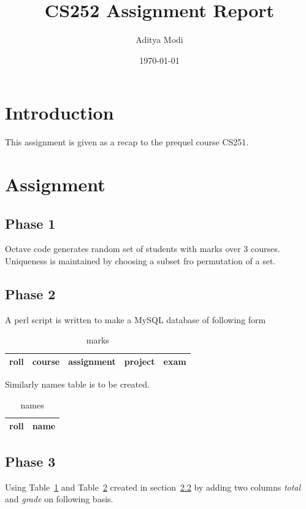 \documentclass{article}
\author{Aditya Modi}
\title{CS252 Assignment Report}
\date{\today}
\begin{document}
\maketitle

\section{Introduction}
This assignment is given as a recap to the prequel course CS251.

\section{Assignment}

\subsection{Phase 1}
\label{octave}
Octave code generates random set of students with marks over 3 courses. Uniqueness is maintained by choosing a subset fro permutation of a set.
\subsection{Phase 2}
\label{p2}
A perl script is written to make a MySQL database of following form\\

\begin{table}[!htpb]
	\label{tab:marks}
	\begin{center}
		\begin{tabular}{|c|c|c|c|c|}
		\hline
		roll & course & assignment & project & exam \\
		\hline
		\end{tabular}
	\end{center}
	\caption{marks}
\end{table}

Similarly names table is to be created.

\begin{table}[!htpb]
	\label{tab:names}
	\begin{center}
		\begin{tabular}{|c|c|}
		\hline
		roll & name \\
		\hline
		\end{tabular}
	\end{center}
	\caption{names}
\end{table}

\subsection{Phase 3}
Using Table~\ref{tab:marks} and Table~\ref{tab:names} created in section~\ref{p2} by adding two columns \emph{total} and \emph{grade} on following basis.
\end{document}
